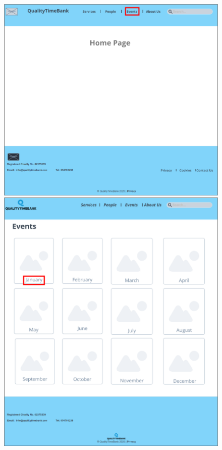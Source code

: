 \documentclass[a4paper, 11pt, parskip=half, headsepline]{scrreprt}
\begin{document}
\begin{figure}[H]
    \begin{minipage}[t]{0.5\textwidth}
        \centering
    	\includegraphics[width=1\linewidth, keepaspectratio]{scenarios/scenario-21}
    	\caption{}
    	\label{fig:scenario-21}
    \end{minipage}
    \hspace*{\fill}
    \begin{minipage}[t]{0.5\textwidth}
        \centering
    	\includegraphics[width=1\linewidth, keepaspectratio]{scenarios/scenario-22}
    	\caption{}
    	\label{fig:scenario-22}
    \end{minipage}
\end{figure}
\end{document}
